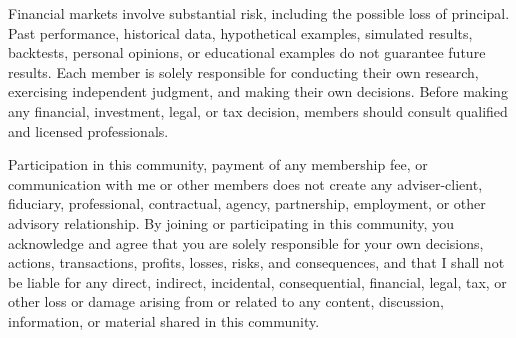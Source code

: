 \documentclass[11pt]{ctexart}
\begin{document}
{Financial markets involve substantial risk, including the possible loss of principal. Past performance, historical data, hypothetical examples, simulated results, backtests, personal opinions, or educational examples do not guarantee future results. Each member is solely responsible for conducting their own research, exercising independent judgment, and making their own decisions. Before making any financial, investment, legal, or tax decision, members should consult qualified and licensed professionals.\par
Participation in this community, payment of any membership fee, or communication with me or other members does not create any adviser-client, fiduciary, professional, contractual, agency, partnership, employment, or other advisory relationship. By joining or participating in this community, you acknowledge and agree that you are solely responsible for your own decisions, actions, transactions, profits, losses, risks, and consequences, and that I shall not be liable for any direct, indirect, incidental, consequential, financial, legal, tax, or other loss or damage arising from or related to any content, discussion, information, or material shared in this community.\par
}
\end{document}
